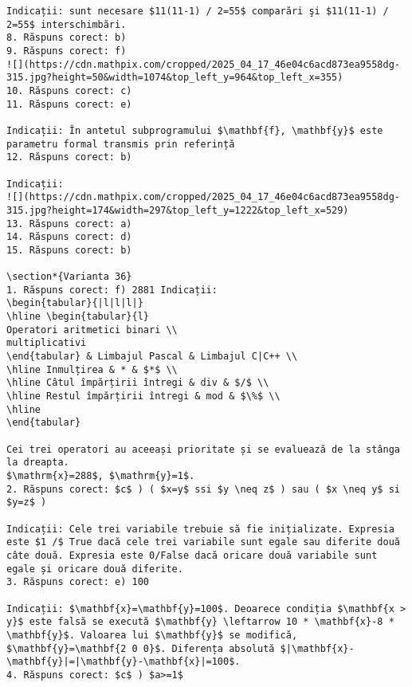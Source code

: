 \begin{verbatim}
Indicații: sunt necesare $11(11-1) / 2=55$ comparări şi $11(11-1) / 2=55$ interschimbări.
8. Răspuns corect: b)
9. Răspuns corect: f)
![](https://cdn.mathpix.com/cropped/2025_04_17_46e04c6acd873ea9558dg-315.jpg?height=50&width=1074&top_left_y=964&top_left_x=355)
10. Răspuns corect: c)
11. Răspuns corect: e)

Indicații: În antetul subprogramului $\mathbf{f}, \mathbf{y}$ este parametru formal transmis prin referință
12. Răspuns corect: b)

Indicații:
![](https://cdn.mathpix.com/cropped/2025_04_17_46e04c6acd873ea9558dg-315.jpg?height=174&width=297&top_left_y=1222&top_left_x=529)
13. Răspuns corect: a)
14. Răspuns corect: d)
15. Răspuns corect: b)

\section*{Varianta 36}
1. Răspuns corect: f) 2881 Indicații:
\begin{tabular}{|l|l|l|}
\hline \begin{tabular}{l} 
Operatori aritmetici binari \\
multiplicativi
\end{tabular} & Limbajul Pascal & Limbajul C|C++ \\
\hline Inmulțirea & * & $*$ \\
\hline Câtul împărțirii întregi & div & $/$ \\
\hline Restul împărțirii întregi & mod & $\%$ \\
\hline
\end{tabular}

Cei trei operatori au aceeași prioritate și se evaluează de la stânga la dreapta.
$\mathrm{x}=288$, $\mathrm{y}=1$.
2. Răspuns corect: $c$ ) ( $x=y$ ssi $y \neq z$ ) sau ( $x \neq y$ si $y=z$ )

Indicații: Cele trei variabile trebuie să fie inițializate. Expresia este $1 /$ True dacă cele trei variabile sunt egale sau diferite două câte două. Expresia este 0/False dacă oricare două variabile sunt egale și oricare două diferite.
3. Răspuns corect: e) 100

Indicații: $\mathbf{x}=\mathbf{y}=100$. Deoarece condiția $\mathbf{x > y}$ este falsă se execută $\mathbf{y} \leftarrow 10 * \mathbf{x}-8 * \mathbf{y}$. Valoarea lui $\mathbf{y}$ se modifică, $\mathbf{y}=\mathbf{2 0 0}$. Diferența absolută $|\mathbf{x}-\mathbf{y}|=|\mathbf{y}-\mathbf{x}|=100$.
4. Răspuns corect: $c$ ) $a>=1$


\end{verbatim}
